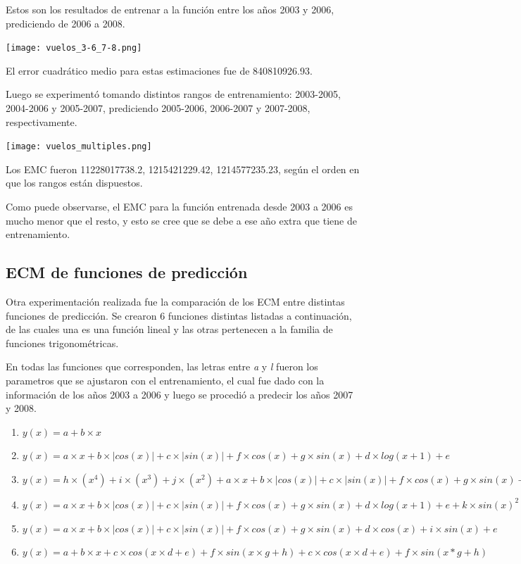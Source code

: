 Estos son los resultados de entrenar a la función entre los años 2003 y 2006, prediciendo de 2006 a 2008.

\texttt{[image: vuelos\_3-6\_7-8.png]}

El error cuadrático medio para estas estimaciones fue de 840810926.93.

Luego se experimentó tomando distintos rangos de entrenamiento: 2003-2005, 2004-2006 y 2005-2007, prediciendo 2005-2006, 2006-2007 y 2007-2008, respectivamente.

\texttt{[image: vuelos\_multiples.png]}

Los EMC fueron 11228017738.2, 1215421229.42, 1214577235.23, según el orden en que los rangos están dispuestos.

Como puede observarse, el EMC para la función entrenada desde 2003 a 2006 es mucho menor que el resto, y esto se cree que se debe a ese año extra que tiene de entrenamiento.


\subsection{ECM de funciones de predicción}

Otra experimentación realizada fue la comparación de los ECM entre distintas funciones de predicción. Se crearon 6 funciones distintas listadas a continuación, de las cuales una es una función lineal y las otras pertenecen a la familia de funciones trigonométricas.

En todas las funciones que corresponden, las letras entre \textit{a} y \textit{l} fueron los parametros que se ajustaron con el entrenamiento, el cual fue dado con la información de los años 2003 a 2006 y luego se procedió a predecir los años 2007 y 2008.

\begin{enumerate}
  \item $y(x) = a + b \times x$
  \item $y(x) = a \times x + b  \times  |cos(x)| + c  \times  |sin(x)| + f  \times  cos(x) + g  \times  sin(x) + d  \times  log(x+1) + e$
  \item $y(x) = h \times (x^4) + i \times (x^3) + j \times (x^2) + a \times x + b  \times  |cos(x)| + c  \times  |sin(x)| + f  \times  cos(x) + g  \times  sin(x) + d  \times  log(x+1) + e$
  \item $y(x) = a \times x + b  \times  |cos(x)| + c  \times  |sin(x)| + f  \times  cos(x) + g  \times  sin(x) + d  \times  log(x+1) + e + k  \times  sin(x) ^ 2 + l  \times  cos(x) ^ 2$
  \item $y(x) = a \times x + b  \times  |cos(x)| + c  \times  |sin(x)| + f  \times  cos(x) + g  \times  sin(x) + d  \times  cos(x) + i  \times  sin(x)  + e$
  \item $y(x) = a + b  \times  x + c  \times  cos(x \times d+e) + f  \times  sin(x \times g+h) + c  \times  cos(x \times d+e) + f  \times  sin(x*g+h)$
\end{enumerate}


